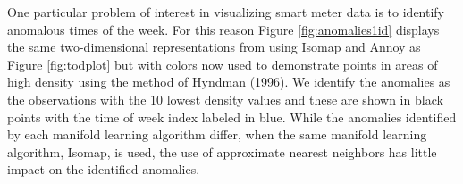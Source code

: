 \documentclass[12pt]{article}
\begin{document}
\begin{table}

\caption{\label{tab:quality1id}Comparison of Trustworthiness measure using true nearest neighbors, k-d trees and Annoy for four manifold learning methods in meter ID 1003. Isomap with Annoy gives the highest Trustworthiness. }
\centering
{}
\end{table}

\begin{table}

\caption{\label{tab:time1id}Comparison of computation time using true nearest neighbors, k-d trees, and Annoy for four manifold learning methods in meter ID 1003. Generally, k-d tree is faster than Annoy except when combined with Hessian LLE }
\centering
{}
\end{table}

One particular problem of interest in visualizing smart meter data is to identify anomalous times of the week. For this reason Figure \ref{fig:anomalies1id} displays the same two-dimensional representations from using Isomap and Annoy as Figure \ref{fig:todplot} but with colors now used to demonstrate points in areas of high density using the method of Hyndman (1996). We identify the anomalies as the observations with the 10 lowest density values and these are shown in black points with the time of week index labeled in blue. While the anomalies identified by each manifold learning algorithm differ, when the same manifold learning algorithm, Isomap, is used, the use of approximate nearest neighbors has little impact on the identified anomalies.
\end{document}
